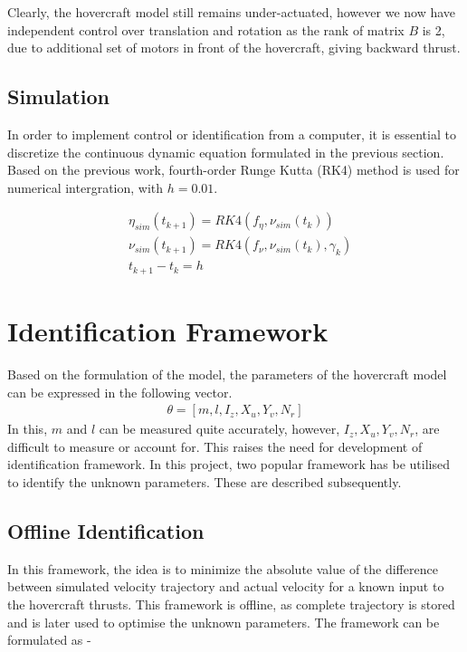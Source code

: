 \documentclass[12pt,titlepage]{article}
\begin{document}
Clearly, the hovercraft model still remains under-actuated, however we now have independent control over translation and rotation as the rank of matrix $B$ is 2, due to additional set of motors in front of the hovercraft, giving backward thrust. 

\subsection{Simulation}
In order to implement control or identification from a computer, it is essential to discretize the continuous dynamic equation formulated in the previous section. Based on the previous work, fourth-order Runge Kutta (RK4) method is used for numerical intergration, with $h=0.01$.

\begin{subequations}
\begin{alignat}{2}
& \eta_{sim}(t_{k+1}) = RK4(f_\eta,\nu_{sim}(t_k)) \\
& \nu_{sim}(t_{k+1}) = RK4(f_\nu,\nu_{sim}(t_k),\gamma_k) \\
& t_{k+1} - t_k = h
\end{alignat}
\label{eq:RK4}
\end{subequations}


\section{Identification Framework}
Based on the formulation of the model, the parameters of the hovercraft model can be expressed in the following vector. 
\begin{align}
    \theta = [m,l,I_z,X_u,Y_v,N_r]
\end{align}
In this, $m$ and $l$ can be measured quite accurately, however, $I_z,X_u,Y_v,N_r$, are difficult to measure or account for. This raises the need for development of identification framework. In this project, two popular framework has be utilised to identify the unknown parameters. These are described subsequently. 

\subsection{Offline Identification}
In this framework, the idea is to minimize the absolute value of the difference between simulated velocity trajectory and actual velocity for a known input to the hovercraft thrusts. This framework is offline, as complete trajectory is stored and is later used to optimise the unknown parameters. The framework can be formulated as - 
\end{document}

